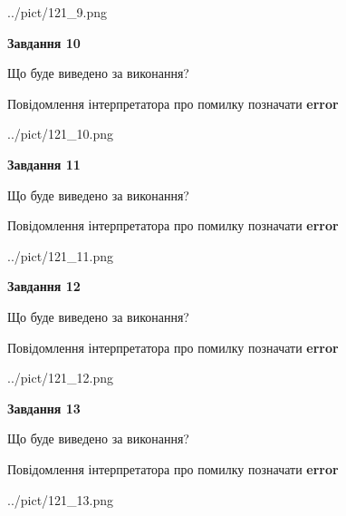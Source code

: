 \documentclass[11pt, ukrainian]{article}
\begin{document}
{\begin {large}
\begin{center}
	{../pict/121_9.png}
\end{center}
\newpage

{\begin {center}\textbf{Завдання 10}\end {center}}\par
Що буде виведено за виконання? \par
Повідомлення інтерпретатора про помилку позначати \textbf{error}

\begin{center}
	{../pict/121_10.png}
\end{center}
\newpage

{\begin {center}\textbf{Завдання 11}\end {center}}\par
Що буде виведено за виконання? \par
Повідомлення інтерпретатора про помилку позначати \textbf{error}

\begin{center}
	{../pict/121_11.png}
\end{center}
\newpage

{\begin {center}\textbf{Завдання 12}\end {center}}\par
Що буде виведено за виконання? \par
Повідомлення інтерпретатора про помилку позначати \textbf{error}

\begin{center}
	{../pict/121_12.png}
\end{center}
\newpage

{\begin {center}\textbf{Завдання 13}\end {center}}\par
Що буде виведено за виконання? \par
Повідомлення інтерпретатора про помилку позначати \textbf{error}

\begin{center}
	{../pict/121_13.png}
\end{center}
\newpage


\end{large}}
\end{document}
